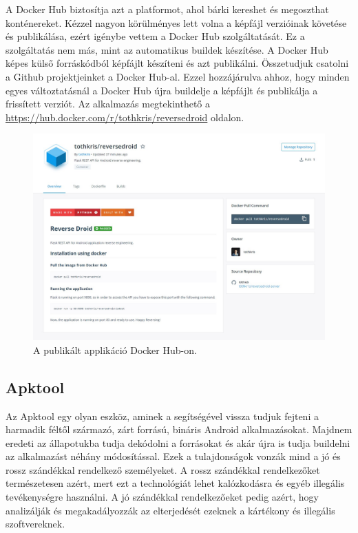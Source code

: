 \documentclass{thesis-ekf}
\theoremstyle{definition}
\theoremstyle{remark}
\begin{document}
A Docker Hub biztosítja azt a platformot, ahol bárki kereshet és megoszthat konténereket.
Kézzel nagyon körülményes lett volna a képfájl verzióinak követése és publikálása, ezért igénybe vettem a Docker Hub szolgáltatását.
Ez a szolgáltatás nem más, mint az automatikus buildek készítése.
A Docker Hub képes külső forráskódból képfájlt készíteni és azt publikálni.
Összetudjuk csatolni a Github projektjeinket a Docker Hub-al. 
Ezzel hozzájárulva ahhoz, hogy minden egyes változtatásnál a Docker Hub újra buildelje a képfájlt és publikálja a frissített verziót.
Az alkalmazás megtekinthető a \url{https://hub.docker.com/r/tothkris/reversedroid} oldalon.

\begin{figure}[!h]
	\centering
	\includegraphics[width=15cm]{pictures/docker_hub}
	\caption{A publikált applikáció Docker Hub-on.}
	\label{dockerhub}
\end{figure}

\subsection{Apktool}

Az Apktool egy olyan eszköz, aminek a segítségével vissza tudjuk fejteni a harmadik féltől származó, zárt forrású, bináris Android alkalmazásokat.
Majdnem eredeti az állapotukba tudja dekódolni a forrásokat és akár újra is tudja buildelni az alkalmazást néhány módosítással.
Ezek a tulajdonságok vonzák mind a jó és rossz szándékkal rendelkező személyeket.
A rossz szándékkal rendelkezőket természetesen azért, mert ezt a technológiát lehet kalózkodásra és egyéb illegális tevékenységre használni.
A jó szándékkal rendelkezőeket pedig azért, hogy analizálják és megakadályozzák az elterjedését ezeknek a kártékony és illegális szoftvereknek.
\end{document}
